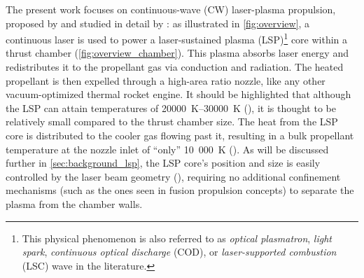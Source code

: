         The present work focuses on continuous-wave (CW) laser-plasma propulsion, proposed by \textcite{noredApplicationHighPower1976} and studied in detail by \textcite{keeferLaserSustainedPlasmas1989}: as illustrated in \autoref{fig:overview}, a continuous laser is used to power a laser-sustained plasma (LSP)\footnote{This physical phenomenon is also referred to as \emph{optical plasmatron}, \emph{light spark}, \emph{continuous optical discharge} (COD), or \emph{laser-supported combustion} (LSC) wave in the literature.} core within a thrust chamber (\autoref{fig:overview_chamber}). This plasma absorbs laser energy and redistributes it to the propellant gas via conduction and radiation. The heated propellant is then expelled through a high-area ratio nozzle, like any other vacuum-optimized thermal rocket engine. It should be highlighted that although the LSP can attain temperatures of \qtyrange{20000}{30000}{K} (\textcite{noredApplicationHighPower1976}), it is thought to be relatively small compared to the thrust chamber size. The heat from the LSP core is distributed to the cooler gas flowing past it, resulting in a bulk propellant temperature at the nozzle inlet of ``only'' 10~000~K (\textcite{duplayDesignRapidTransit2022}). As will be discussed further in \autoref{sec:background_lsp}, the LSP core's position and size is easily controlled by the laser beam geometry (\textcite{keeferLaserSustainedPlasmas1989}), requiring no additional confinement mechanisms (such as the ones seen in fusion propulsion concepts) to separate the plasma from the chamber walls. 
        
